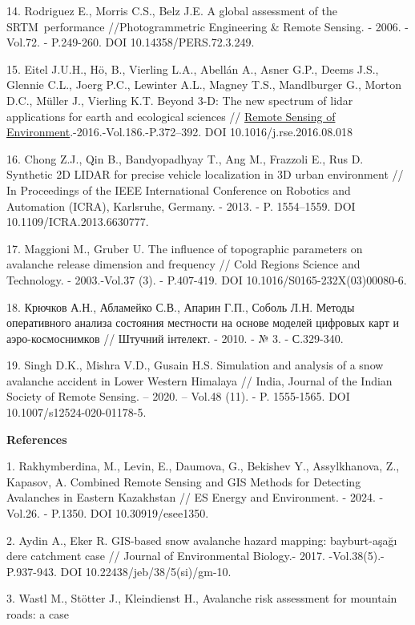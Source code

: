 14. Rodriguez E., Morris C.S., Belz J.E. A global assessment of the
SRTM~performance //Photogrammetric Engineering \& Remote Sensing. -
2006. -Vol.72. - P.249-260. DOI 10.14358/PERS.72.3.249.

15. Eitel J.U.H., Hö, B., Vierling L.A., Abellán A., Asner G.P., Deems
J.S., Glennie C.L., Joerg P.C., Lewinter A.L., Magney T.S., Mandlburger
G., Morton D.C., Müller J., Vierling K.T. Beyond 3-D: The new spectrum
of lidar applications for earth and ecological sciences //
\href{https://asu.elsevierpure.com/en/publications/beyond-3-d-the-new-spectrum-of-lidar-applications-for-earth-and-e}{\hfill\break
Remote Sensing of Environment}.-2016.-Vol.186.-P.372--392. DOI
10.1016/j.rse.2016.08.018

16. Chong Z.J., Qin B., Bandyopadhyay T., Ang M., Frazzoli E., Rus D.
Synthetic 2D LIDAR for precise vehicle localization in 3D urban
environment // In Proceedings of the IEEE International Conference on
Robotics and Automation (ICRA), Karlsruhe, Germany. - 2013. - P.
1554--1559. DOI 10.1109/ICRA.2013.6630777.

17. Maggioni M., Gruber U. The influence of topographic parameters on
avalanche release dimension and frequency // Cold Regions Science and
Technology. - 2003.-Vol.37 (3). - P.407-419. DOI
10.1016/S0165-232X(03)00080-6.

18. Крючков А.Н., Абламейко С.В., Апарин Г.П., Соболь Л.Н. Методы
оперативного анализа состояния местности на основе моделей цифровых карт
и аэро-космоснимков // Штучний інтелект. - 2010. - № 3. - С.329-340.

19. Singh D.K., Mishra V.D., Gusain H.S. Simulation and analysis of a
snow avalanche accident in Lower Western Himalaya // India, Journal of
the Indian Society of Remote Sensing. -- 2020. -- Vol.48 (11). - P.
1555-1565. DOI 10.1007/s12524-020-01178-5.

{\bfseries References}

1. Rakhymberdina, M., Levin, E., Daumova, G., Bekishev Y., Assylkhanova,
Z., Kapasov, A. Combined Remote Sensing and GIS Methods for Detecting
Avalanches in Eastern Kazakhstan // ES Energy and Environment. - 2024. -
Vol.26. - P.1350. DOI 10.30919/esee1350.

2. Aydin A., Eker R. GIS-based snow avalanche hazard mapping:
bayburt-aşağı dere catchment case // Journal of Environmental Biology.-
2017. -Vol.38(5).- P.937-943. DOI 10.22438/jeb/38/5(si)/gm-10.

3. Wastl M., Stötter J., Kleindienst H., Avalanche risk assessment for
mountain roads: a case

